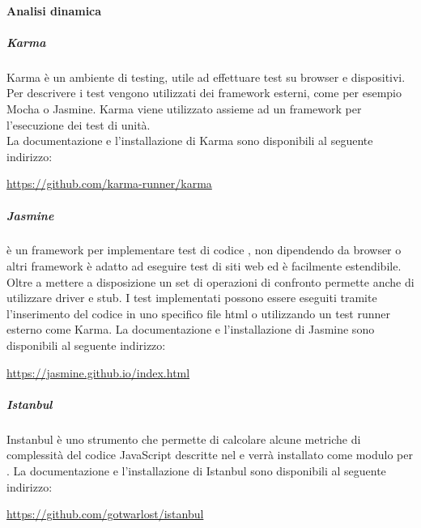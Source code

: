 		\paragraph{Analisi dinamica}
		\subparagraph{Karma}\label{sec:Karma}
		Karma è un ambiente di testing, utile ad effettuare test su browser e dispositivi. Per descrivere i test vengono utilizzati dei framework esterni, come per esempio Mocha o Jasmine. Karma viene utilizzato assieme ad un framework per l'esecuzione dei test di unità. \\
		La documentazione e l'installazione di Karma sono disponibili al seguente indirizzo:
		\begin{center}
			\url{https://github.com/karma-runner/karma}
		\end{center}
		\subparagraph{Jasmine}\label{sec:Jasmine}
		 è un framework per implementare test di codice \js, non dipendendo da browser o altri framework è adatto ad eseguire test di siti web ed è facilmente estendibile. Oltre a mettere a disposizione un set di operazioni di confronto permette anche di utilizzare driver e stub. I test implementati possono essere eseguiti tramite l'inserimento del codice in uno specifico file html o utilizzando un test runner esterno come Karma.
		La documentazione e l'installazione di Jasmine sono disponibili al seguente indirizzo:
		\begin{center}
			\url{https://jasmine.github.io/index.html}
		\end{center}
		\subparagraph{Istanbul}\label{sec:Istanbul}
		Instanbul è uno strumento che permette di calcolare alcune metriche di complessità del codice JavaScript descritte nel \pdqv{} e verrà installato come modulo per .
		La documentazione e l'installazione di Istanbul sono disponibili al seguente indirizzo:
		\begin{center}
			\url{https://github.com/gotwarlost/istanbul}
		\end{center}
